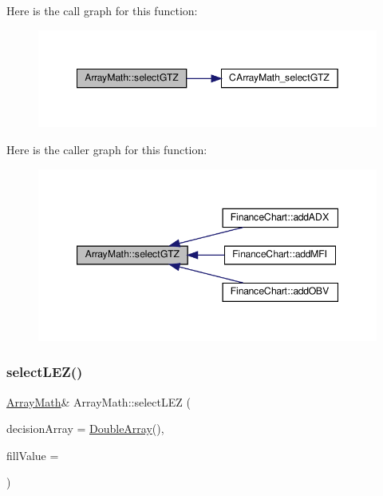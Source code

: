 Here is the call graph for this function\+:
\nopagebreak
\begin{figure}[H]
\begin{center}
\leavevmode
\includegraphics[width=349pt]{class_array_math_aadfd40e8527d58dc41cceec240d1f9b8_cgraph}
\end{center}
\end{figure}
Here is the caller graph for this function\+:
\nopagebreak
\begin{figure}[H]
\begin{center}
\leavevmode
\includegraphics[width=347pt]{class_array_math_aadfd40e8527d58dc41cceec240d1f9b8_icgraph}
\end{center}
\end{figure}
\mbox{\label{class_array_math_a63ec8c97034104b0ede0227683583eac}} 
\subsubsection{\texorpdfstring{select\+L\+E\+Z()}{selectLEZ()}}
{\footnotesize\ttfamily \hyperlink{class_array_math}{Array\+Math}\& Array\+Math\+::select\+L\+EZ (\begin{DoxyParamCaption}\item[{\hyperlink{class_double_array}{Double\+Array}}]{decision\+Array = {\ttfamily \hyperlink{class_double_array}{Double\+Array}()},  }\item[{double}]{fill\+Value = {} }\end{DoxyParamCaption})\hspace{0.3cm}{\ttfamily [inline]}}



